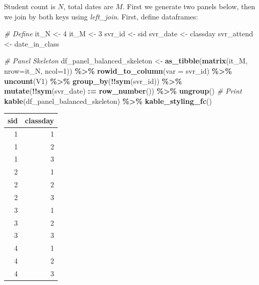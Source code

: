 \documentclass[
]{book}
\newenvironment{Shaded}{\begin{snugshade}}{\end{snugshade}}
\newcommand{\CommentTok}[1]{\textcolor[rgb]{0.56,0.35,0.01}{\textit{#1}}}
\newcommand{\DataTypeTok}[1]{\textcolor[rgb]{0.13,0.29,0.53}{#1}}
\newcommand{\DecValTok}[1]{\textcolor[rgb]{0.00,0.00,0.81}{#1}}
\newcommand{\ErrorTok}[1]{\textcolor[rgb]{0.64,0.00,0.00}{\textbf{#1}}}
\newcommand{\KeywordTok}[1]{\textcolor[rgb]{0.13,0.29,0.53}{\textbf{#1}}}
\newcommand{\NormalTok}[1]{#1}
\newcommand{\OperatorTok}[1]{\textcolor[rgb]{0.81,0.36,0.00}{\textbf{#1}}}
\newcommand{\StringTok}[1]{\textcolor[rgb]{0.31,0.60,0.02}{#1}}
\begin{document}
Student count is \(N\), total dates are \(M\). First we generate two panels below, then we join by both keys using \emph{left\_join}. First, define dataframes:

\begin{Shaded}
\begin{Highlighting}[]
\CommentTok{\# Define}
\NormalTok{it\_N \textless{}{-}}\StringTok{ }\DecValTok{4}
\NormalTok{it\_M \textless{}{-}}\StringTok{ }\DecValTok{3}
\NormalTok{svr\_id \textless{}{-}}\StringTok{ \textquotesingle{}sid\textquotesingle{}}
\NormalTok{svr\_date \textless{}{-}}\StringTok{ \textquotesingle{}classday\textquotesingle{}}
\NormalTok{svr\_attend \textless{}{-}}\StringTok{ \textquotesingle{}date\_in\_class\textquotesingle{}}

\CommentTok{\# Panel Skeleton}
\NormalTok{df\_panel\_balanced\_skeleton \textless{}{-}}\StringTok{ }\KeywordTok{as\_tibble}\NormalTok{(}\KeywordTok{matrix}\NormalTok{(it\_M, }\DataTypeTok{nrow=}\NormalTok{it\_N, }\DataTypeTok{ncol=}\DecValTok{1}\NormalTok{)) }\OperatorTok{\%\textgreater{}\%}
\StringTok{  }\KeywordTok{rowid\_to\_column}\NormalTok{(}\DataTypeTok{var =}\NormalTok{ svr\_id) }\OperatorTok{\%\textgreater{}\%}
\StringTok{  }\KeywordTok{uncount}\NormalTok{(V1) }\OperatorTok{\%\textgreater{}\%}
\StringTok{  }\KeywordTok{group\_by}\NormalTok{(}\OperatorTok{!!}\KeywordTok{sym}\NormalTok{(svr\_id)) }\OperatorTok{\%\textgreater{}\%}\StringTok{ }\KeywordTok{mutate}\NormalTok{(}\OperatorTok{!!}\KeywordTok{sym}\NormalTok{(svr\_date) }\OperatorTok{:}\ErrorTok{=}\StringTok{ }\KeywordTok{row\_number}\NormalTok{()) }\OperatorTok{\%\textgreater{}\%}
\StringTok{  }\KeywordTok{ungroup}\NormalTok{()}
\CommentTok{\# Print}
\KeywordTok{kable}\NormalTok{(df\_panel\_balanced\_skeleton) }\OperatorTok{\%\textgreater{}\%}
\StringTok{  }\KeywordTok{kable\_styling\_fc}\NormalTok{()}
\end{Highlighting}
\end{Shaded}

\begin{table}[!h]
\centering
\begin{tabular}{r|r}
\hline
sid & classday\\
\hline
\rowcolor{gray!6}  1 & 1\\
\hline
1 & 2\\
\hline
\rowcolor{gray!6}  1 & 3\\
\hline
2 & 1\\
\hline
\rowcolor{gray!6}  2 & 2\\
\hline
2 & 3\\
\hline
\rowcolor{gray!6}  3 & 1\\
\hline
3 & 2\\
\hline
\rowcolor{gray!6}  3 & 3\\
\hline
4 & 1\\
\hline
\rowcolor{gray!6}  4 & 2\\
\hline
4 & 3\\
\hline
\end{tabular}
\end{table}
\end{document}
